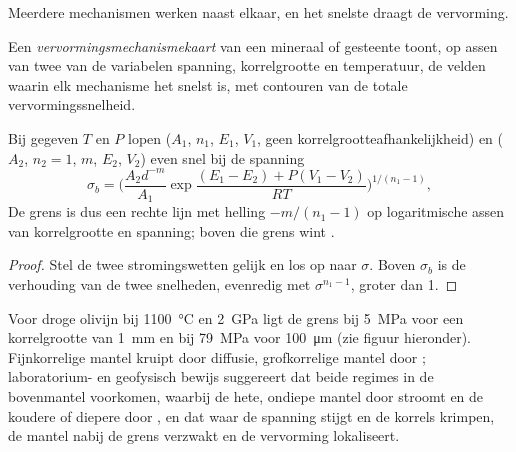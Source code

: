 Meerdere mechanismen werken naast elkaar, en het snelste draagt de vervorming.

\begin{definition}[Vervormingsmechanismekaart]\label{def:b3:deformation-mechanisms:deformation-map}
Een \emph{vervormingsmechanismekaart} van een
mineraal of gesteente toont, op assen van twee van de variabelen spanning, korrelgrootte en
temperatuur, de velden waarin elk mechanisme het snelst is, met contouren
van de totale vervormingssnelheid.
\end{definition}

\begin{proposition}\label{prop:b3:deformation-mechanisms:boundary}
Bij gegeven $T$ en $P$ lopen  ($A_1$, $n_1$, $E_1$, $V_1$, geen
korrelgrootteafhankelijkheid) en  ($A_2$, $n_2 = 1$, $m$, $E_2$, $V_2$)
even snel bij de spanning
\[
  \sigma_b = \biggl(\frac{A_2d^{-m}}{A_1}
  \exp\frac{(E_1 - E_2) + P(V_1 - V_2)}{RT}\biggr)^{1/(n_1 - 1)} ,
\]
De grens is dus een rechte lijn met helling $-m/(n_1 - 1)$ op logaritmische
assen van korrelgrootte en spanning; boven die grens wint .
\end{proposition}

\begin{proof}
Stel de twee stromingswetten gelijk en los op naar $\sigma$. Boven $\sigma_b$ is de verhouding van
de twee snelheden, evenredig met $\sigma^{n_1 - 1}$, groter dan 1.
\end{proof}

Voor droge olivijn bij \qty{1100}{\celsius} en \qty{2}{GPa} ligt de grens bij
\qty{5}{MPa} voor een korrelgrootte van \qty{1}{mm} en bij \qty{79}{MPa} voor
\qty{100}{\micro m} (zie figuur hieronder). Fijnkorrelige mantel kruipt door diffusie,
grofkorrelige mantel door ; laboratorium- en geofysisch bewijs suggereert
dat beide regimes in de bovenmantel voorkomen, waarbij de hete, ondiepe mantel door
 stroomt en de koudere of diepere door , en dat waar
de spanning stijgt en de korrels krimpen, de mantel nabij de grens verzwakt
en de vervorming lokaliseert.

